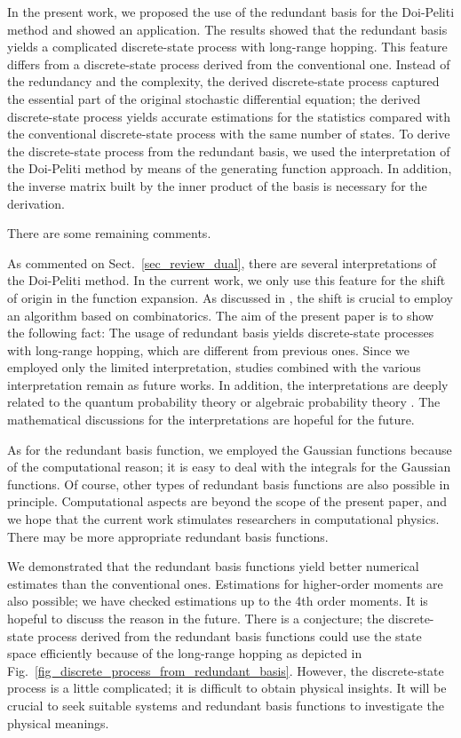 \documentclass[sn-mathphys,Numbered]{sn-jnl}%
\theoremstyle{thmstyleone}%
\theoremstyle{thmstyletwo}%
\theoremstyle{thmstylethree}%
\begin{document}
In the present work, we proposed the use of the redundant basis for the Doi-Peliti method and showed an application. The results showed that the redundant basis yields a complicated discrete-state process with long-range hopping. This feature differs from a discrete-state process derived from the conventional one. Instead of the redundancy and the complexity, the derived discrete-state process captured the essential part of the original stochastic differential equation; the derived discrete-state process yields accurate estimations for the statistics compared with the conventional discrete-state process with the same number of states. To derive the discrete-state process from the redundant basis, we used the interpretation of the Doi-Peliti method by means of the generating function approach. In addition, the inverse matrix built by the inner product of the basis is necessary for the derivation. 



There are some remaining comments.

As commented on Sect.~\ref{sec_review_dual}, there are several interpretations of the Doi-Peliti method. In the current work, we only use this feature for the shift of origin in the function expansion. As discussed in \cite{Ohkubo2021}, the shift is crucial to employ an algorithm based on combinatorics. The aim of the present paper is to show the following fact: The usage of redundant basis yields discrete-state processes with long-range hopping, which are different from previous ones. Since we employed only the limited interpretation, studies combined with the various interpretation remain as future works. In addition, the interpretations are deeply related to the quantum probability theory or algebraic probability theory \cite{Hora_book}. The mathematical discussions for the interpretations are hopeful for the future.


As for the redundant basis function, we employed the Gaussian functions because of the computational reason; it is easy to deal with the integrals for the Gaussian functions. Of course, other types of redundant basis functions are also possible in principle. Computational aspects are beyond the scope of the present paper, and we hope that the current work stimulates researchers in computational physics. There may be more appropriate redundant basis functions.

We demonstrated that the redundant basis functions yield better numerical estimates than the conventional ones. Estimations for higher-order moments are also possible; we have checked estimations up to the 4th order moments. It is hopeful to discuss the reason in the future. There is a conjecture; the discrete-state process derived from the redundant basis functions could use the state space efficiently because of the long-range hopping as depicted in Fig.~\ref{fig_discrete_process_from_redundant_basis}. However, the discrete-state process is a little complicated; it is difficult to obtain physical insights. It will be crucial to seek suitable systems and redundant basis functions to investigate the physical meanings. 
\end{document}
